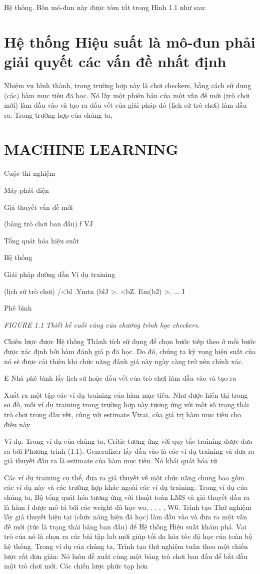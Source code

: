 Hệ thống. Bốn mô-đun này được tóm tắt trong Hình 1.1 như sau:

\section{Hệ thống Hiệu suất là mô-đun phải giải quyết các vấn đề nhất định}

Nhiệm vụ hình thành, trong trường hợp này là chơi checkers, bằng cách sử dụng (các) hàm mục tiêu đã học. Nó lấy một phiên bản của một vấn đề mới (trò chơi mới) làm đầu vào và tạo ra dấu vết của giải pháp đó (lịch sử trò chơi) làm đầu ra. Trong trường hợp của chúng ta,

\section{MACHINE LEARNING}

Cuộc thí nghiệm

Máy phát điện

Giả thuyết vấn đề mới

(bảng trò chơi ban đầu) f VJ

Tổng quát hóa hiệu suất

Hệ thống

Giải pháp đường dẫn Ví dụ training

(lịch sử trò chơi) /<bl .Ymtn (blJ >. <bZ. Em(b2) >. ... I

Phê bình

\noindent\textit{FIGURE 1.1 Thiết kế cuối cùng của chương trình học checkers.}

Chiến lược được Hệ thống Thành tích sử dụng để chọn bước tiếp theo ở mỗi bước được xác định bởi hàm đánh giá p đã học. Do đó, chúng ta kỳ vọng hiệu suất của nó sẽ được cải thiện khi chức năng đánh giá này ngày càng trở nên chính xác.

E Nhà phê bình lấy lịch sử hoặc dấu vết của trò chơi làm đầu vào và tạo ra

Xuất ra một tập các ví dụ training của hàm mục tiêu. Như được hiển thị trong sơ đồ, mỗi ví dụ training trong trường hợp này tương ứng với một số trạng thái trò chơi trong dấu vết, cùng với estimate Vtrai, của giá trị hàm mục tiêu cho điều này

Ví dụ. Trong ví dụ của chúng ta, Critic tương ứng với quy tắc training được đưa ra bởi Phương trình (1.1). Generalizer lấy đầu vào là các ví dụ training và đưa ra giả thuyết đầu ra là estimate của hàm mục tiêu. Nó khái quát hóa từ

Các ví dụ training cụ thể, đưa ra giả thuyết về một chức năng chung bao gồm các ví dụ này và các trường hợp khác ngoài các ví dụ training. Trong ví dụ của chúng ta, Bộ tổng quát hóa tương ứng với thuật toán LMS và giả thuyết đầu ra là hàm f được mô tả bởi các weight đã học wo, . . . , W6. Trình tạo Thử nghiệm lấy giả thuyết hiện tại (chức năng hiện đã học) làm đầu vào và đưa ra một vấn đề mới (tức là trạng thái bảng ban đầu) để Hệ thống Hiệu suất khám phá. Vai trò của nó là chọn ra các bài tập lab mới giúp tối đa hóa tốc độ học của toàn bộ hệ thống. Trong ví dụ của chúng ta, Trình tạo thử nghiệm tuân theo một chiến lược rất đơn giản: Nó luôn đề xuất cùng một bảng trò chơi ban đầu để bắt đầu một trò chơi mới. Các chiến lược phức tạp hơn

